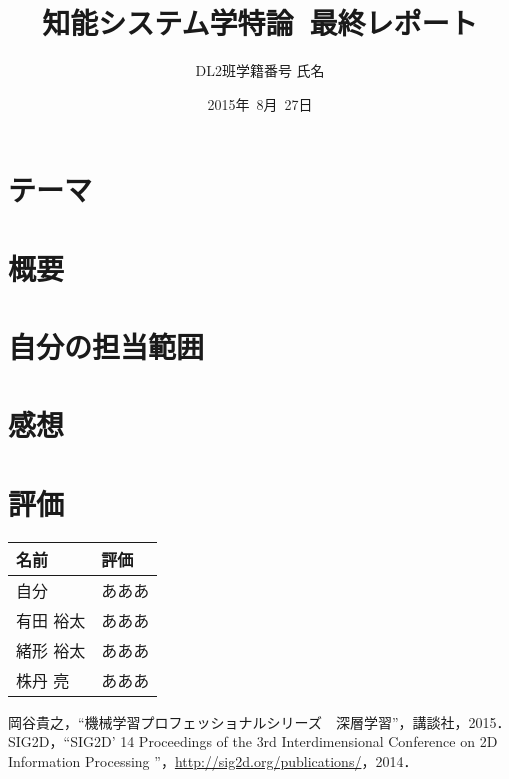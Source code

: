\documentclass[a4paper,10pt]{jsarticle}
\title{知能システム学特論\ 最終レポート}
\author{
DL2班\hspace{5mm}学籍番号 \hspace{5mm}氏名 \\
}
\date{2015年\ 8月\ 27日}
\begin{document}
\maketitle

\section{テーマ}
\label{sec:テーマ}


\section{概要}
\label{sec:概要}


\section{自分の担当範囲}
\label{sec:自分の担当範囲}


\section{感想}
\label{sec:感想}


\section{評価}
\label{sec:評価}
\begin{table}[H]
  \begin{center}
    \begin{tabular}{l|p{12cm}} \hline
      名前 & 評価 \\ \hline \hline
      自分 & あああ \\ \hline
      有田 裕太 & あああ \\ \hline
      緒形 裕太 & あああ \\ \hline
      株丹 亮 & あああ\\ \hline
    \end{tabular}
  \end{center}
\end{table}


\begin{thebibliography}{99}
  岡谷貴之，``機械学習プロフェッショナルシリーズ　深層学習''，講談社，2015．
  SIG2D，``SIG2D' 14 Proceedings of the 3rd Interdimensional Conference on 2D Information Processing ''，\url{http://sig2d.org/publications/}，2014．
 \end{thebibliography}
\end{document}
